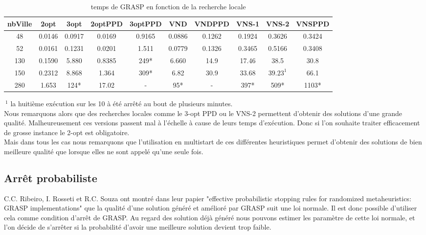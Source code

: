 \documentclass[12pt,a4paper]{article}
\begin{document}
\begin{table}[!h]
\leftskip -1.1cm
{
\begin{tabular}{|*{10}{c|}}
  \hline
  nbVille & 2opt & 3opt & 2optPPD & 3optPPD & VND & VNDPPD & VNS-1 & VNS-2 & VNSPPD \\
  \hline
  48 & 0.0146 & 0.0917 & 0.0169 & 0.9165 & 0.0886 & 0.1262 & 0.1924 & 0.3626 & 0.3424 \\ 
  52 & 0.0161 & 0.1231 & 0.0201 & 1.511 & 0.0779 & 0.1326 & 0.3465 & 0.5166 & 0.3408 \\
  130 & 0.1590 & 5.880 & 0.8385 & 249* & 6.660 & 14.9 & 17.46 & 38.5 & 30.8 \\
  150 & 0.2312 & 8.868 & 1.364 & 309* & 6.82 & 30.9 & 33.68 & $39.23^1$ & 66.1 \\  
  280 & 1.653 & 124* & 17.02 & - & 95* & - & 397* & 509* & 1103* \\
  \hline
\end{tabular}
}
\caption{temps de GRASP en fonction de la recherche locale}
\label{recherchelocaleGRASPtemps}
\end{table}
$~^1$ la huitième exécution sur les 10 à été arrêté au bout de plusieurs minutes.\\

Nous remarquons alors que des recherches locales comme le 3-opt PPD ou le VNS-2 permettent d'obtenir des solutions d'une grande qualité. Malheureusement ces versions passent mal à l’échelle à cause de leurs temps d’exécution. Donc si l'on souhaite traiter efficacement de grosse instance le 2-opt est obligatoire.\\

Mais dans tous les cas nous remarquons que l'utilisation en multistart de ces différentes heuristiques permet d'obtenir des solutions de bien meilleure qualité que lorsque elles ne sont appelé qu'une seule fois.\\

\subsection{Arrêt probabiliste}

C.C. Ribeiro, I. Rosseti et R.C. Souza ont montré dans leur papier "effective probabilistic stopping rules for randomized metaheuristics: GRASP implementations" que la qualité d'une solution généré et amélioré par GRASP suit une loi normale. Il est donc possible d'utiliser cela comme condition d’arrêt de GRASP. Au regard des solution déjà généré nous pouvons estimer les paramètre de cette loi normale, et l'on décide de s’arrêter si la probabilité d'avoir une meilleure solution devient trop faible.\\
\end{document}

